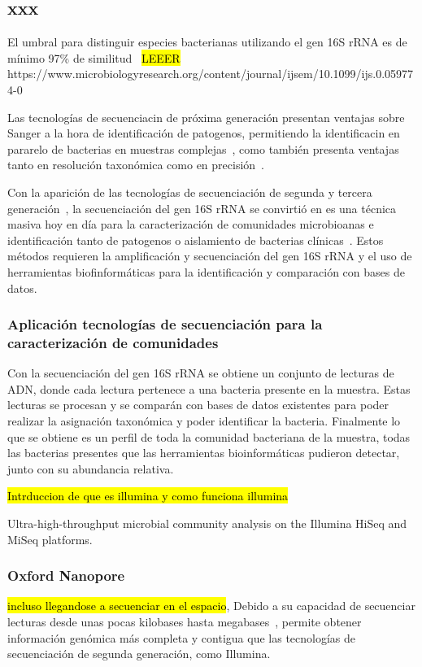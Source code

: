 \subsection{xxx}

El umbral para distinguir especies bacterianas utilizando el gen 16S rRNA es de mínimo 97\% de similitud~\cite{kim2014towards}
\hl{LEEER} https://www.microbiologyresearch.org/content/journal/ijsem/10.1099/ijs.0.059774-0


Las tecnologías de secuenciacin de próxima generación presentan ventajas sobre Sanger a la hora de identificación de patogenos, permitiendo la identificacin en pararelo de bacterias en muestras complejas~\cite{peker2019comparison}, como también presenta ventajas tanto en resolución taxonómica como en precisión~\cite{motro2017next}.

Con la aparición de las tecnologías de secuenciación de segunda y tercera generación~\cite{janda200716s,pollock2018madness}, la secuenciación del gen 16S rRNA se convirtió en es una técnica masiva hoy en día para la caracterización de comunidades microbioanas e identificación tanto de patogenos o aislamiento de bacterias clínicas~\cite{patel200116s}.
Estos métodos requieren la amplificación y secuenciación del gen 16S rRNA y el uso de herramientas biofinformáticas para la identificación y comparación con bases de datos.

\subsubsection{Aplicación tecnologías de secuenciación para la caracterización de comunidades}
Con la secuenciación del gen 16S rRNA se obtiene un conjunto de lecturas de ADN, donde cada lectura pertenece a una bacteria presente en la muestra. Estas lecturas se procesan y se comparán con bases de datos existentes para poder realizar la asignación taxonómica y poder identificar la bacteria. Finalmente lo que se obtiene es un perfil de toda la comunidad bacteriana de la muestra, todas las bacterias presentes que las herramientas bioinformáticas pudieron detectar, junto con su abundancia relativa.


\hl{Intrduccion de que es illumina y como funciona illumina}

Ultra-high-throughput microbial community analysis on the Illumina HiSeq and MiSeq platforms.


\subsubsection{Oxford Nanopore}
\hl{incluso llegandose a secuenciar en el espacio},
Debido a su capacidad de secuenciar lecturas desde unas pocas kilobases hasta megabases~\cite{amarasinghe2020opportunities}, permite obtener información genómica más completa y contigua que las tecnologías de secuenciación de segunda generación, como Illumina.

